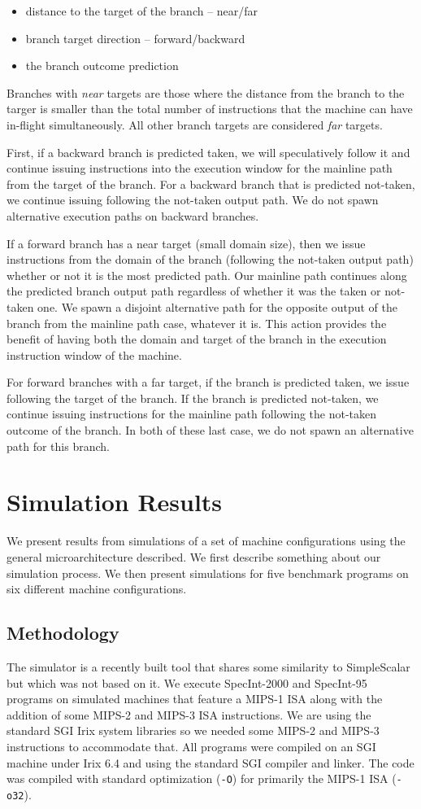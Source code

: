\documentclass[10pt,dvips]{article}
\begin{document}
\begin{itemize}
\item{distance to the target of the branch -- near/far}
\item{branch target direction -- forward/backward}
\item{the branch outcome prediction}
\end{itemize}   

Branches with \textit{near} targets are those where
the distance from the branch to the targer is smaller than
the total number of instructions that the machine can have
in-flight simultaneously.  All other branch targets are considered
\textit{far} targets.

First, if a backward branch is predicted taken,
we will speculatively follow it and continue issuing instructions
into the execution window for the mainline path from the target
of the branch.  
For a backward branch that
is predicted not-taken, we continue issuing following the
not-taken output path.
We do not spawn alternative execution paths on backward branches.

If a forward branch has a near target (small domain size), then we
issue instructions from the domain of the branch (following the
not-taken output path) whether or not it is the most predicted path.
Our mainline path continues along the predicted branch output path
regardless of whether it was the taken or not-taken one.  
We spawn a disjoint
alternative path for the opposite output of the branch from
the mainline path case, whatever it is.
This action
provides the benefit of having both the domain and target of the branch
in the execution instruction window of the machine.  

For forward branches with a far target,
if the branch is predicted taken, we issue following the target
of the branch.  If the branch is predicted not-taken, we continue
issuing instructions for the mainline path following the not-taken
outcome of the branch.  In both of these last case, we do not
spawn an alternative path for this branch.
%
\section{Simulation Results}
%
We present results from simulations of a set of machine configurations
using the general microarchitecture described.
We first describe something about our simulation process.
We then present simulations for five benchmark programs
on six different machine configurations.
%
\subsection{Methodology}
%
The simulator is a recently built tool that shares some similarity
to SimpleScalar \cite{Austin97} but which was not based on it.
We execute
SpecInt-2000 and SpecInt-95 programs on simulated machines
that feature a MIPS-1 ISA along with the addition of some MIPS-2 and
MIPS-3 ISA instructions.  We are using the standard SGI Irix system
libraries so we needed some MIPS-2 and MIPS-3 instructions to accommodate
that.  All programs were compiled on an SGI machine under Irix 6.4 and
using the standard SGI compiler and linker.  The code was compiled with
standard optimization ({\tt -O}) for primarily the MIPS-1 ISA ({\tt -o32}).
%
\end{document}
